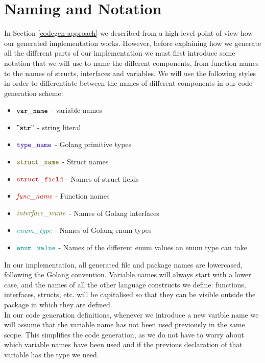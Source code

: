 \documentclass[12pt,twoside]{report}
\begin{document}
\section{Naming and Notation}\label{naming-and-notation}
In Section \ref{codegen-approach} we described from a high-level point of view how our generated implementation works. However, before explaining how we generate all the different parts of our implementation we must first introduce some notation that we will use to name the different components, from function names to the names of structs, interfaces and variables. We will use the following styles in order to differentiate between the names of different components in our code generation scheme:

\begin{itemize}
    \item ${\mathtt{var\_name}}$ - variable names
    \item $\mathtt{"str"}$ - string literal
    \item $\typename{type\_name}$ - Golang primitive types
    \item $\structname{struct\_name}$ - Struct names
    \item $\structfield{struct\_field}$ - Names of struct fields
    \item $\functionname{func\_name}$ - Function names
    \item $\interfacename{interface\_name}$ - Names of Golang interfaces
    \item $\enumtype{enum\_type}$ - Names of Golang enum types
    \item $\enumvalue{enum\_value}$ - Names of the different enum values an enum type can take
\end{itemize}

In our implementation, all generated file and package names are lowercased, following the Golang convention. Variable names will always start with a lower case, and the names of all the other language constructs we define: functions, interfaces, structs, etc. will be capitalised so that they can be visible outside the package in which they are defined.\\

In our code generation definitions, whenever we introduce a new varible name we will assume that the variable name has not been used previously in the same scope. This simplifies the code generation, as we do not have to worry about which variable names have been used and if the previous declaration of that variable has the type we need.\\
\end{document}
